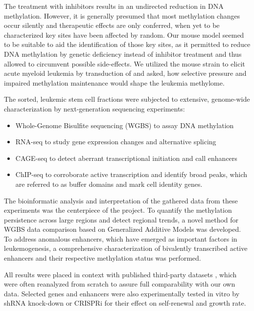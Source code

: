 The treatment with inhibitors results in an undirected reduction in DNA methylation. However, it is generally presumed that most methylation changes occur silently and therapeutic effects are only conferred, when yet to be characterized key sites have been affected by random. Our mouse model seemed to be suitable to aid the identification of those key sites, as it permitted to reduce DNA methylation by genetic  deficiency instead of inhibitor treatment and thus allowed to circumvent possible side-effects. We utilized the \dnmtchip mouse strain to elicit acute myeloid leukemia by transduction of \mllafnine and asked, how selective pressure and impaired methylation maintenance would shape the leukemia methylome.

The \kitpos sorted, leukemic stem cell fractions were subjected to extensive, genome-wide characterization by next-generation sequencing experiments:

\begin{itemize}
	\item Whole-Genome Bisulfite sequencing (WGBS) to assay DNA methylation
	\item RNA-seq to study gene expression changes and alternative splicing
	\item CAGE-seq to detect aberrant transcriptional initiation and call enhancers
	\item \hisfourthree ChIP-seq to corroborate active transcription and identify broad peaks, which are referred to as buffer domains and mark cell identity genes\cite{Benayoun2014}.
\end{itemize} 

The bioinformatic analysis and interpretation of the gathered data from these experiments was the centerpiece of the project. To quantify the methylation persistence across large regions and detect regional trends, a novel method for WGBS data comparison based on Generalized Additive Models was developed. To address anomalous enhancers, which have emerged as important factors in leukemogenesis, a comprehensive characterization of bivalently transcribed active enhancers and their respective methylation status was performed. 

All results were placed in context with published third-party datasets , which were often reanalyzed from scratch to assure full comparability with our own data. Selected genes and enhancers were also experimentally tested in vitro by shRNA knock-down or CRISPRi for their effect on self-renewal and growth rate. 